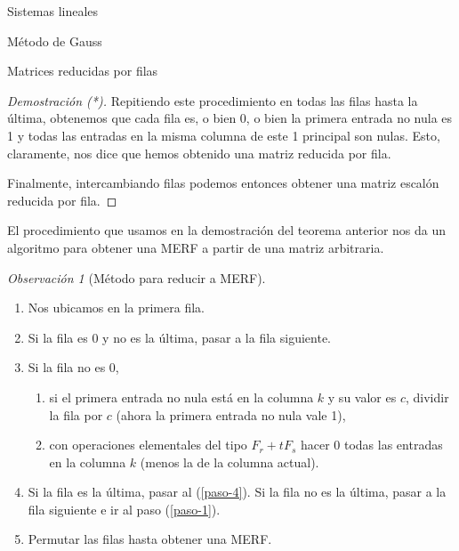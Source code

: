 \documentclass[a4paper,12pt,twoside,spanish]{amsbook}
\theoremstyle{definition}
\theoremstyle{remark}
\newtheorem{observacion}{Observaci\'on}[section]
\begin{document}
\begin{chapter}{Sistemas lineales}
\begin{section}{Método de Gauss }
\begin{subsection}{Matrices reducidas por filas}
\begin{proof}[Demostración (*)]
					Repitiendo este procedimiento en todas las filas hasta la última, obtenemos que cada fila es, o bien 0, o bien la primera entrada no nula es  1 y todas las entradas en la misma columna de este 1 principal son nulas.   Esto, claramente, nos dice que hemos obtenido una matriz reducida por fila.  
					
				 Finalmente, intercambiando filas podemos entonces obtener una matriz escalón reducida por fila.

					
				\end{proof}
				
				El procedimiento que usamos en la demostración del teorema anterior nos da un algoritmo para obtener una MERF a partir de una matriz arbitraria.
				
				\begin{observacion}[\sc Método para reducir a MERF] \label{metodo-merf}  
					\
									
				\begin{enumerate}
					\item \label{paso-0} Nos ubicamos en la primera fila.
					\item \label{paso-1} Si la fila es 0 y no es la última, pasar a la fila siguiente.
					\item \label{paso-2} Si la fila no es 0, 
					\begin{enumerate}
						\item si el primera entrada no nula está en  la columna $k$ y su valor es $c$, dividir la fila por $c$ (ahora la primera entrada no nula vale 1),
						\item con operaciones elementales del tipo $F_r+ tF_s$ hacer 0  todas las entradas en la columna $k$ (menos la de la columna actual).    
					\end{enumerate}
					\item \label{paso-3} Si la fila es la última, pasar al (\ref{paso-4}). Si la fila no es la última, pasar a la fila siguiente e ir al paso (\ref{paso-1}).  
					\item \label{paso-4} Permutar las filas hasta obtener una MERF. 
				\end{enumerate}
			\end{observacion}
				

\end{subsection}
\end{section}
\end{chapter}
\end{document}
